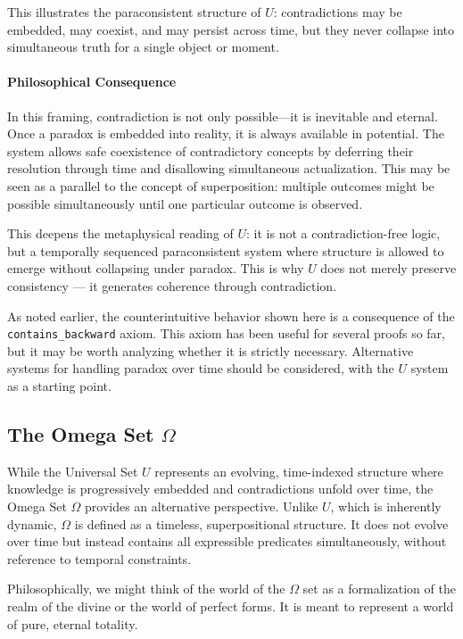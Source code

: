 \documentclass[12pt]{article}
\begin{document}
This illustrates the paraconsistent structure of \( U \): contradictions may be embedded, may coexist, and may persist across time, but they never collapse into simultaneous truth for a single object or moment.

\paragraph{Philosophical Consequence}
In this framing, contradiction is not only possible—it is inevitable and eternal. Once a paradox is embedded into reality, it is always available in potential. The system allows safe coexistence of contradictory concepts by deferring their resolution through time and disallowing simultaneous actualization. This may be seen as a parallel to the concept of superposition: multiple outcomes might be possible simultaneously until one particular outcome is observed.

This deepens the metaphysical reading of \( U \): it is not a contradiction-free logic, but a temporally sequenced paraconsistent system where structure is allowed to emerge without collapsing under paradox. This is why $U$ does not merely preserve consistency — it generates coherence through contradiction.

As noted earlier, the counterintuitive behavior shown here is a consequence of the \\
\texttt{contains\_backward} axiom. This axiom has been useful for several proofs so far, but it may be worth analyzing whether it is strictly necessary. Alternative systems for handling paradox over time should be considered, with the $U$ system as a starting point.


\subsection{The Omega Set \( \Omega \)}

While the Universal Set \( U \) represents an evolving, time-indexed structure where knowledge is progressively embedded and contradictions unfold over time, the Omega Set \( \Omega \) provides an alternative perspective. Unlike \( U \), which is inherently dynamic, \( \Omega \) is defined as a timeless, superpositional structure. It does not evolve over time but instead contains all expressible predicates simultaneously, without reference to temporal constraints.

Philosophically, we might think of the world of the \( \Omega \) set as a formalization of the realm of the divine or the world of perfect forms. It is meant to represent a world of pure, eternal totality.
\end{document}
